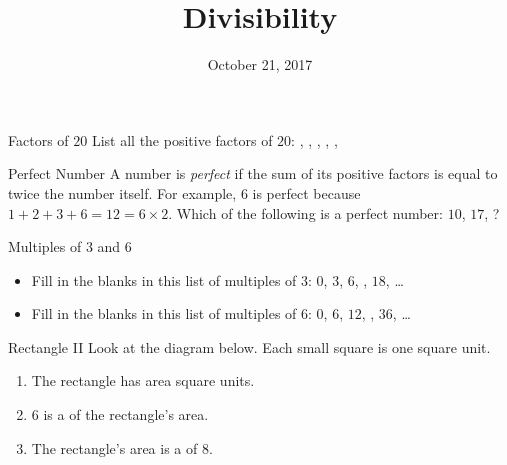 \documentclass[12pt,letterpaper]{article}
\title{Divisibility}
\date{October 21, 2017}
\begin{document}
\maketitle

\thispagestyle{empty}

\begin{problem}{Factors of \(20\)}
 List all the positive factors of \(20\):
 , ,
 , ,
 , 
\end{problem}

\begin{problem}{Perfect Number}
  A number is \emph{perfect} if the sum of its positive factors is equal to twice the number
  itself. For example, \(6\) is perfect because \(1+2+3+6=12=6\times2\). Which of the
  following is a perfect number: \(10\), \(17\), ?
\end{problem}

\begin{problem}{Multiples of \(3\) and \(6\)}
 \begin{itemize}
  \item Fill in the blanks in this list of multiples of \(3\): \(0\), \(3\),
  \(6\), ,
  \(18\), \ldots

  \item Fill in the blanks in this list of multiples of \(6\): \(0\), \(6\),
  \(12\), ,
  \(36\), \ldots
 \end{itemize}
\end{problem}

\begin{problem}{Rectangle II}
 Look at the diagram below. Each small square is one square unit.

 \begin{center}
 \end{center}

 \begin{enumerate}
  \item The rectangle has area  square units.
  \item \(6\) is a  of the
  rectangle's area.
  \item The rectangle's area is a
   of \(8\).
 \end{enumerate}
\end{problem}
\end{document}
